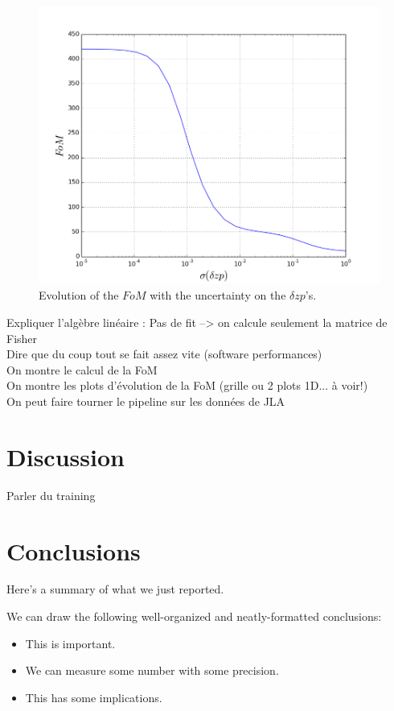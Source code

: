 \documentclass[\docopts]{\docclass}
\begin{document}
\begin{figure}[ht]
  \centering
  \includegraphics[width=0.7\linewidth]{FoM_20k.png}
  \caption{Evolution of the $FoM$ with the uncertainty on the $\delta zp$'s.}
  \label{fig:fom_zp}
\end{figure}


Expliquer l'algèbre linéaire : Pas de fit --> on calcule seulement la matrice de Fisher \\
Dire que du coup tout se fait assez vite (software performances) \\
On montre le calcul de la FoM \\
On montre les plots d'évolution de la FoM (grille ou 2 plots 1D... à voir!) \\
On peut faire tourner le pipeline sur les données de JLA \\


\section{Discussion}
\label{sec:discussion}

Parler du training



\section{Conclusions}
\label{sec:conclusions}

Here's a summary of what we just reported.

We can draw the following well-organized and neatly-formatted conclusions:
\begin{itemize}
  \item This is important.
  \item We can measure some number with some precision.
  \item This has some implications.
\end{itemize}
\end{document}
